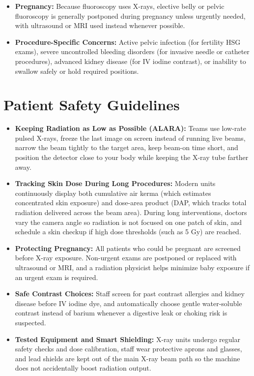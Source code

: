 \begin{itemize}
    \item \textbf{Pregnancy:} Because fluoroscopy uses X-rays, elective belly or pelvic fluoroscopy is generally postponed during pregnancy unless urgently needed, with ultrasound or MRI used instead whenever possible.
    \item \textbf{Procedure-Specific Concerns:} Active pelvic infection (for fertility HSG exams), severe uncontrolled bleeding disorders (for invasive needle or catheter procedures), advanced kidney disease (for IV iodine contrast), or inability to swallow safely or hold required positions.
\end{itemize}

\section{Patient Safety Guidelines}

\begin{itemize}
    \item \textbf{Keeping Radiation as Low as Possible (ALARA):} Teams use low-rate pulsed X-rays, freeze the last image on screen instead of running live beams, narrow the beam tightly to the target area, keep beam-on time short, and position the detector close to your body while keeping the X-ray tube farther away.
    \item \textbf{Tracking Skin Dose During Long Procedures:} Modern units continuously display both cumulative air kerma (which estimates concentrated skin exposure) and dose-area product (DAP, which tracks total radiation delivered across the beam area). During long interventions, doctors vary the camera angle so radiation is not focused on one patch of skin, and schedule a skin checkup if high dose thresholds (such as 5 Gy) are reached.
    \item \textbf{Protecting Pregnancy:} All patients who could be pregnant are screened before X-ray exposure. Non-urgent exams are postponed or replaced with ultrasound or MRI, and a radiation physicist helps minimize baby exposure if an urgent exam is required.
    \item \textbf{Safe Contrast Choices:} Staff screen for past contrast allergies and kidney disease before IV iodine dye, and automatically choose gentle water-soluble contrast instead of barium whenever a digestive leak or choking risk is suspected.
    \item \textbf{Tested Equipment and Smart Shielding:} X-ray units undergo regular safety checks and dose calibration, staff wear protective aprons and glasses, and lead shields are kept out of the main X-ray beam path so the machine does not accidentally boost radiation output.
\end{itemize}

